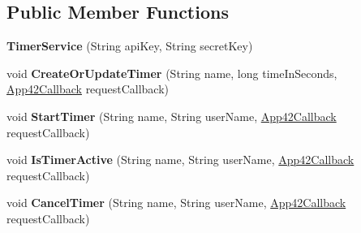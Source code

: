 \subsection*{Public Member Functions}
\begin{DoxyCompactItemize}
\item 
\hypertarget{classcom_1_1shephertz_1_1app42_1_1paas_1_1sdk_1_1windows_1_1timer_1_1_timer_service_a7ca09d4f3286c2241c46caf893940d1d}{{\bfseries Timer\+Service} (String api\+Key, String secret\+Key)}\label{classcom_1_1shephertz_1_1app42_1_1paas_1_1sdk_1_1windows_1_1timer_1_1_timer_service_a7ca09d4f3286c2241c46caf893940d1d}

\item 
\hypertarget{classcom_1_1shephertz_1_1app42_1_1paas_1_1sdk_1_1windows_1_1timer_1_1_timer_service_abbfa08fc7a72e9a8069d356d314d9750}{void {\bfseries Create\+Or\+Update\+Timer} (String name, long time\+In\+Seconds, \hyperlink{interfacecom_1_1shephertz_1_1app42_1_1paas_1_1sdk_1_1windows_1_1_app42_callback}{App42\+Callback} request\+Callback)}\label{classcom_1_1shephertz_1_1app42_1_1paas_1_1sdk_1_1windows_1_1timer_1_1_timer_service_abbfa08fc7a72e9a8069d356d314d9750}

\item 
\hypertarget{classcom_1_1shephertz_1_1app42_1_1paas_1_1sdk_1_1windows_1_1timer_1_1_timer_service_a9c766b998968920a3a1a47f33905c357}{void {\bfseries Start\+Timer} (String name, String user\+Name, \hyperlink{interfacecom_1_1shephertz_1_1app42_1_1paas_1_1sdk_1_1windows_1_1_app42_callback}{App42\+Callback} request\+Callback)}\label{classcom_1_1shephertz_1_1app42_1_1paas_1_1sdk_1_1windows_1_1timer_1_1_timer_service_a9c766b998968920a3a1a47f33905c357}

\item 
\hypertarget{classcom_1_1shephertz_1_1app42_1_1paas_1_1sdk_1_1windows_1_1timer_1_1_timer_service_a4aacf0e82165556853428c3a739241d9}{void {\bfseries Is\+Timer\+Active} (String name, String user\+Name, \hyperlink{interfacecom_1_1shephertz_1_1app42_1_1paas_1_1sdk_1_1windows_1_1_app42_callback}{App42\+Callback} request\+Callback)}\label{classcom_1_1shephertz_1_1app42_1_1paas_1_1sdk_1_1windows_1_1timer_1_1_timer_service_a4aacf0e82165556853428c3a739241d9}

\item 
\hypertarget{classcom_1_1shephertz_1_1app42_1_1paas_1_1sdk_1_1windows_1_1timer_1_1_timer_service_a2007a0d2b0b9a277ef7c5554136079ab}{void {\bfseries Cancel\+Timer} (String name, String user\+Name, \hyperlink{interfacecom_1_1shephertz_1_1app42_1_1paas_1_1sdk_1_1windows_1_1_app42_callback}{App42\+Callback} request\+Callback)}\label{classcom_1_1shephertz_1_1app42_1_1paas_1_1sdk_1_1windows_1_1timer_1_1_timer_service_a2007a0d2b0b9a277ef7c5554136079ab}


\end{DoxyCompactItemize}
